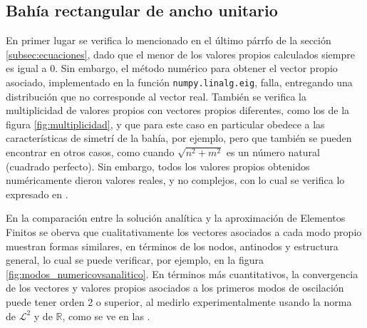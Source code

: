 \subsection{Bah\'ia rectangular de ancho unitario} 
  
  En primer lugar se verifica lo mencionado en el \'ultimo p\'arrfo de la secci\'on \ref{subsec:ecuaciones}, dado que el menor de los valores propios calculados siempre es igual a 0. Sin embargo, el m\'etodo num\'erico para obtener el vector propio asociado, implementado en la funci\'on \verb;numpy.linalg.eig;, falla, entregando una distribuci\'on que no corresponde al vector real. Tambi\'en se verifica la multiplicidad de valores propios con vectores propios diferentes, como los de la figura \ref{fig:multiplicidad}, y que para este caso en particular obedece a las caracter\'isticas de simetr\'i de la bah\'ia, por ejemplo, pero que tambi\'en se pueden encontrar en otros casos, como cuando $\sqrt{n^2+m^2}$ es un n\'umero natural (cuadrado perfecto). Sin embargo, todos los valores propios obtenidos num\'ericamente dieron valores reales, y no complejos, con lo cual se verifica lo expresado en \cite{nica2011}.
  
  En la comparaci\'on entre la soluci\'on anal\'itica y la aproximaci\'on de Elementos Finitos se oberva que cualitativamente los vectores asociados a cada modo propio muestran formas similares, en t\'erminos de los nodos, antinodos y estructura general, lo cual se puede verificar, por ejemplo, en la figura \ref{fig:modos_numericovsanalitico}. En t\'erminos m\'as cuantitativos, la convergencia de los vectores y valores propios asociados a los primeros modos de oscilaci\'on puede tener orden 2 o superior, al medirlo experimentalmente usando la norma de $\mathcal{L}^2$ y de $\mathbb{R}$, como se ve en las .